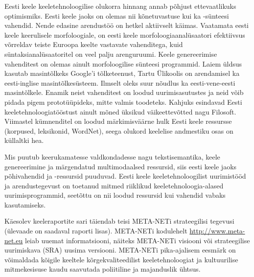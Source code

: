 \begin{multicols}{2}
Eesti keele keeletehnoloogilise olukorra hinnang annab põhjust ettevaatlikuks optimismiks.
Eesti keele jaoks on olemas nii kõnetuvastuse kui ka -sünteesi vahendid. Nende edasine arendustöö on hetkel aktiivselt käimas. 
Vaatamata eesti keele keerulisele morfoloogiale, on eesti keele morfoloogiaanalüsaatori efektiivsus võrreldav teiste Euroopa keelte vastavate vahenditega, kuid süntaksianalüsaatoritel on veel palju arenguruumi. 
Keele genereerimise vahenditest on olemas ainult morfoloogilise sünteesi programmid.
Laiem üldsus kasutab masintõlkeks Google'i tõlketeenust, Tartu Ülikoolis on arendamisel ka eesti-inglise masintõlkesüsteem. Ilmselt oleks suur nõudlus ka eesti-vene-eesti masintõlkele.
Enamik neist vahenditest on loodud uurimisasutustes ja neid võib pidada pigem prototüüpideks, mitte valmis toodeteks. Kahjuks esindavad Eesti keeletehnoloogiatööstust ainult mõned üksikud väikeettevõtted nagu Filosoft.
Viimastel kümnenditel on loodud märkimisväärne hulk Eesti keele ressursse (korpused, leksikonid, WordNet), seega olukord keelelise andmestiku osas on küllaltki hea. 


Mis puutub keerukamatesse valdkondadesse nagu tekstisemantika, keele genereerimine ja märgendatud multimodaalsed ressursid, siis eesti keele jaoks põhivahendid ja -ressursid puuduvad. 
Eesti keele keeletehnoloogilist uurimistööd ja arendustegevust on toetanud mitmed riiklikud keeletehnoloogia-alased uurimisprogrammid, seetõttu on nii loodud ressursid kui vahendid vabaks kasutamiseks. 

Käesolev keeleraportite sari täiendab teisi META-NETi strateegilisi tegevusi (ülevaade on saadaval raporti lisas). 
META-NETi kodulehelt \url{http://www.meta-net.eu} leiab uuemat
informatsiooni, näiteks META-NETi visiooni \cite{Meta1} või
strateegilise uurimis\-kava (SRA) uusima versiooni. 
META-NETi pika-ajalisem eesmärk on võimaldada kõigile keeltele kõrgekvaliteedilist keeletehnoloogiat ja kultuurilise mitmekesisuse kaudu saavutada poliitiline ja majanduslik ühtsus. 

\end{multicols}

